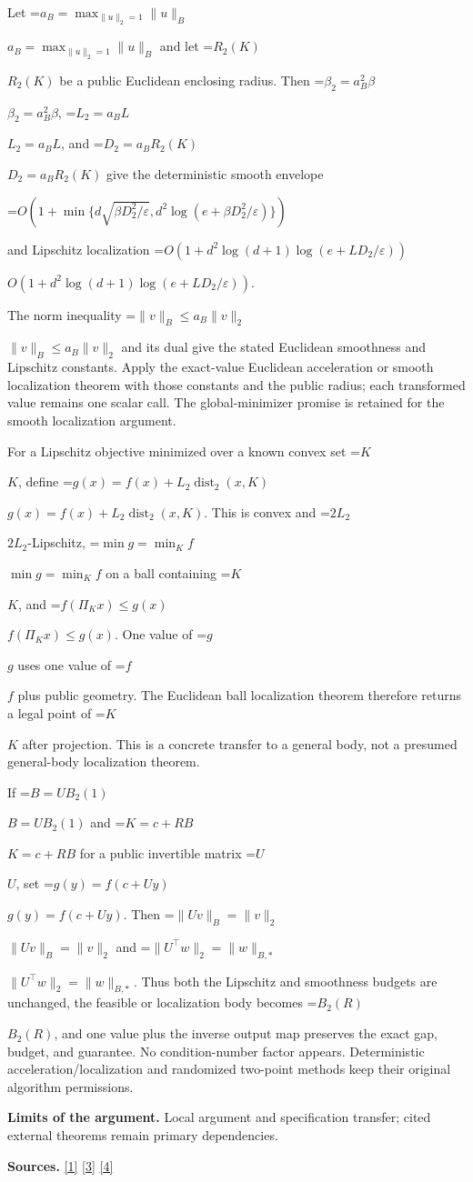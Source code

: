 \documentclass[10pt,a4paper]{article}
\newcommand{\AtlasMath}[1]{\par\begingroup\centering\setbox0=\hbox{$\displaystyle #1$}\ifdim\wd0>1.4\linewidth\typeout{ATLAS WIDE FORMULA: \the\wd0}\fi\ifdim\wd0>\linewidth\resizebox{\linewidth}{!}{\box0}\else\box0\fi\par\endgroup}
\newcommand{\AtlasInlineMath}[1]{\begingroup\setbox0=\hbox{$#1$}\ifdim\wd0>.4\linewidth\endgroup\AtlasMath{#1}\else\endgroup$#1$\fi}
\begin{document}
Let \AtlasInlineMath{a_B=\max_{\|u\|_2=1}\|u\|_B} and let \AtlasInlineMath{R_2(K)} be a public Euclidean enclosing radius. Then \AtlasInlineMath{\beta_2=a_B^2\beta}, \AtlasInlineMath{L_2=a_BL}, and \AtlasInlineMath{D_2=a_BR_2(K)} give the deterministic smooth envelope

\AtlasMath{O\!\left(1+\min\{d\sqrt{\beta D_2^2/\varepsilon},d^2\log(e+\beta D_2^2/\varepsilon)\}\right)}

and Lipschitz localization \AtlasInlineMath{O(1+d^2\log(d+1)\log(e+LD_2/\varepsilon))}.

The norm inequality \AtlasInlineMath{\|v\|_B\le a_B\|v\|_2} and its dual give the stated Euclidean smoothness and Lipschitz constants. Apply the exact-value Euclidean acceleration or smooth localization theorem with those constants and the public radius; each transformed value remains one scalar call. The global-minimizer promise is retained for the smooth localization argument.

For a Lipschitz objective minimized over a known convex set \AtlasInlineMath{K}, define \AtlasInlineMath{g(x)=f(x)+L_2\operatorname{dist}_2(x,K)}. This is convex and \AtlasInlineMath{2L_2}-Lipschitz, \AtlasInlineMath{\min g=\min_K f} on a ball containing \AtlasInlineMath{K}, and \AtlasInlineMath{f(\Pi_Kx)\le g(x)}. One value of \AtlasInlineMath{g} uses one value of \AtlasInlineMath{f} plus public geometry. The Euclidean ball localization theorem therefore returns a legal point of \AtlasInlineMath{K} after projection. This is a concrete transfer to a general body, not a presumed general-body localization theorem.

If \AtlasInlineMath{B=UB_2(1)} and \AtlasInlineMath{K=c+RB} for a public invertible matrix \AtlasInlineMath{U}, set \AtlasInlineMath{g(y)=f(c+Uy)}. Then \AtlasInlineMath{\|Uv\|_B=\|v\|_2} and \AtlasInlineMath{\|U^\top w\|_2=\|w\|_{B,*}}. Thus both the Lipschitz and smoothness budgets are unchanged, the feasible or localization body becomes \AtlasInlineMath{B_2(R)}, and one value plus the inverse output map preserves the exact gap, budget, and guarantee. No condition-number factor appears. Deterministic acceleration/localization and randomized two-point methods keep their original algorithm permissions.

\textbf{Limits of the argument.} Local argument and specification transfer; cited external theorems remain primary dependencies.

\textbf{Sources.} \href{https://arxiv.org/html/2610.00345v1}{[1]} \href{https://arxiv.org/html/2607.16558v2}{[3]} \href{https://www.mathnet.ru/php/archive.phtml?jrnid=mzm&option_lang=eng&paperid=1697&wshow=paper}{[4]}
\end{document}

